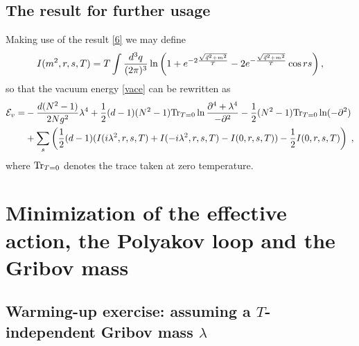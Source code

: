 \subsection{The result for further usage}
Making use of the result \eqref{6} we may define
\begin{equation}  \label{defi}
I(m^2,r,s,T) = T \int\frac{d^{3}q}{(2\pi)^{3}}\ln\left(1+e^{-2\frac{\sqrt{%
\vec{q}^2+m^2}}{T}}-2e^{-\frac{\sqrt{\vec{q}^2+m^2}}{T}}\cos rs\right),
\end{equation}
so that the vacuum energy \eqref{vace} can be rewritten as
\begin{equation}  \label{vactwee}
\begin{aligned} {\cal E}_{v} = &- \frac{d(N^2-1)}{2Ng^2} \lambda^4 + \frac12
(d-1)(N^2-1) \mathrm{Tr}_{T=0}\ln\frac{\partial^4+\lambda^4}{-\partial^2} - \frac12
(N^2-1) \mathrm{Tr}_{T=0}\ln(-\partial^2) \\ &+ \sum_s \left( \frac12 (d-1)
(I(i\lambda^2,r,s,T)+I(-i\lambda^2,r,s,T)-I(0,r,s,T)) - \frac12 I(0,r,s,T)
\right) \;, \end{aligned}
\end{equation}
where $\mathrm{Tr}_{T=0}$ denotes the trace taken at zero temperature.


\section{Minimization of the effective action, the Polyakov loop and the Gribov mass}
\label{sec5}

\subsection{Warming-up exercise: assuming a \texorpdfstring{$T$}{T}-independent Gribov mass \texorpdfstring{$\lambda$}{lambda}}
\label{Tonafhankelijk}


